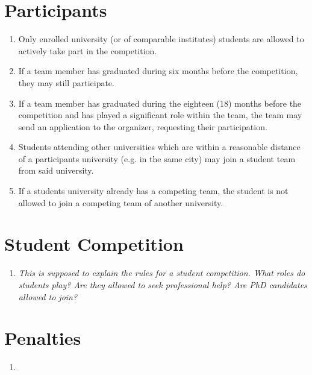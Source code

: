     \section{Participants}
    \begin{enumerate}
      \item Only enrolled university (or of comparable institutes) students are allowed to actively take part in the competition.
      \item If a team member has graduated during six months before the competition, they may still participate.
      \item If a team member has graduated during the eighteen (18) months before the competition and has played a significant role within the team,
      the team may send an application to the organizer, requesting their participation. 
      \item Students attending other universities which are within a reasonable distance of a participants university (e.g. in the same city) may join
      a student team from said university.
      \item If a students university already has a competing team, the student is not allowed to join a competing team of 
      another university.  
    \end{enumerate}

    \section{Student Competition}
    \begin{enumerate}
      \item \emph{This is supposed to explain the rules for a student competition. What roles do students play? 
      Are they allowed to seek professional help? Are PhD candidates allowed to join?}
    \end{enumerate}



    \section{Penalties}
    \begin{enumerate}
      \item 
    \end{enumerate}

